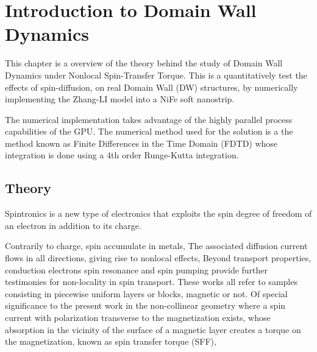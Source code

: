 
\chapter{Introduction to Domain Wall Dynamics} %

\label{Introduction to Domain Wall Dynamics} %


This chapter is a overview of the theory behind the study of Domain Wall Dynamics under Nonlocal Spin-Transfer Torque. This is a quantitatively test the effects of spin-diffusion, on real Domain Wall (DW) structures, by numerically implementing the Zhang-LI model into a NiFe soft nanostrip. 


The numerical implementation takes advantage of the highly parallel process capabilities of the GPU. The numerical method used for the solution is a the method known as Finite Differences in the Time Domain (FDTD) whose integration is done using a 4th order Runge-Kutta integration.


\section{Theory}

Spintronics is a new type of electronics that exploits the spin degree of freedom of an electron in addition to its charge. \cite{spinz}

Contrarily to charge, spin accumulate in metals, The associated diffusion current flows in all directions, giving rise to nonlocal effects, Beyond transport properties, conduction electrons spin resonance and spin pumping provide further testimonies for non-locality in spin transport. These works all refer to samples consisting in piecewise uniform layers or blocks, magnetic or not. Of special significance to the present work in the non-collinear geometry where a spin current with polarization transverse to the magnetization exists, whose absorption in the vicinity of the surface of a magnetic layer creates a torque on the magnetization, known as spin transfer torque (SFF),  \cite{claudio}



